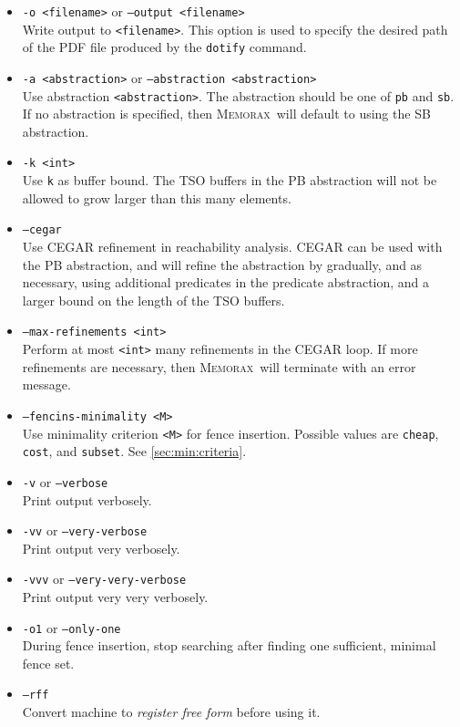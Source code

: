 \documentclass[a4paper]{article}
\newcommand{\memorax}{\textsc{Memorax}}
\begin{document}
\begin{itemize}
\item {\tt -o <filename>} or {\tt --output <filename>}\\ Write output
  to {\tt <filename>}. This option is used to specify the desired path
  of the PDF file produced by the {\tt dotify} command.

\item {\tt -a <abstraction>} or {\tt --abstraction <abstraction>}
  \\ Use abstraction {\tt <abstraction>}. The abstraction should be
  one of {\tt pb} and {\tt sb}. If no abstraction is specified, then
  \memorax\ will default to using the SB abstraction.

\item {\tt -k <int>}\\ Use {\tt k} as buffer bound. The TSO buffers in
  the PB abstraction will not be allowed to grow larger than this many
  elements.

\item {\tt --cegar}\\ Use CEGAR refinement in reachability
  analysis. CEGAR can be used with the PB abstraction, and will refine
  the abstraction by gradually, and as necessary, using additional
  predicates in the predicate abstraction, and a larger bound on the
  length of the TSO buffers.

\item {\tt --max-refinements <int>}\\ Perform at most {\tt <int>} many
  refinements in the CEGAR loop. If more refinements are necessary,
  then \memorax\ will terminate with an error message.

\item {\tt --fencins-minimality <M>}\\
%
  Use minimality criterion {\tt <M>} for fence insertion. Possible
  values are {\tt cheap}, {\tt cost}, and {\tt subset}. See
  \cref{sec:min:criteria}.

\item {\tt -v} or {\tt --verbose}\\
  Print output verbosely.
\item {\tt -vv} or {\tt --very-verbose}\\
  Print output very verbosely.
\item {\tt -vvv} or {\tt --very-very-verbose}\\
  Print output very very verbosely.
\item {\tt -o1} or {\tt --only-one}\\
  During fence insertion, stop searching after finding one sufficient, minimal fence set.
\item {\tt --rff}\\
  Convert machine to \emph{register free form}
  before using it. \explainrff
\end{itemize}
\end{document}
